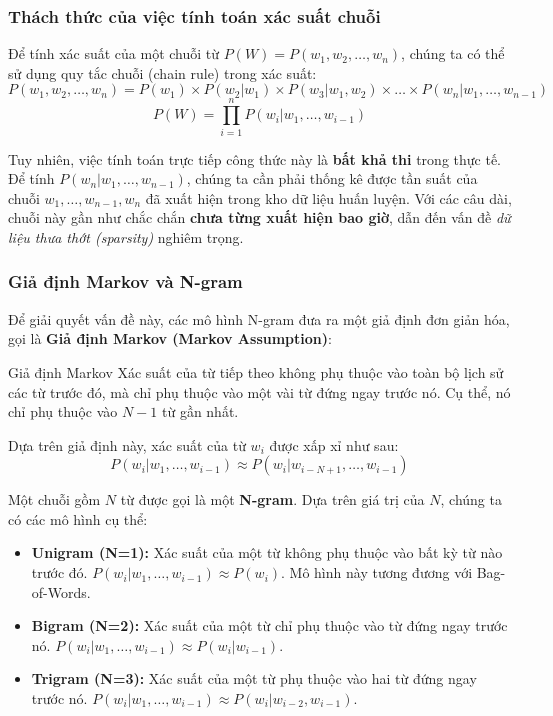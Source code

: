 \subsubsection{Thách thức của việc tính toán xác suất chuỗi}
Để tính xác suất của một chuỗi từ $P(W) = P(w_1, w_2, \dots, w_n)$, chúng ta có thể sử dụng quy tắc chuỗi (chain rule) trong xác suất:
$$ P(w_1, w_2, \dots, w_n) = P(w_1) \times P(w_2|w_1) \times P(w_3|w_1, w_2) \times \dots \times P(w_n|w_1, \dots, w_{n-1}) $$
$$ P(W) = \prod_{i=1}^{n} P(w_i | w_1, \dots, w_{i-1}) $$

Tuy nhiên, việc tính toán trực tiếp công thức này là \textbf{bất khả thi} trong thực tế. Để tính $P(w_n|w_1, \dots, w_{n-1})$, chúng ta cần phải thống kê được tần suất của chuỗi $w_1, \dots, w_{n-1}, w_n$ đã xuất hiện trong kho dữ liệu huấn luyện. Với các câu dài, chuỗi này gần như chắc chắn \textbf{chưa từng xuất hiện bao giờ}, dẫn đến vấn đề \textit{dữ liệu thưa thớt (sparsity)} nghiêm trọng.

\subsubsection{Giả định Markov và N-gram}
Để giải quyết vấn đề này, các mô hình N-gram đưa ra một giả định đơn giản hóa, gọi là \textbf{Giả định Markov (Markov Assumption)}:

\begin{assess}{Giả định Markov}
Xác suất của từ tiếp theo không phụ thuộc vào toàn bộ lịch sử các từ trước đó, mà chỉ phụ thuộc vào một vài từ đứng ngay trước nó. Cụ thể, nó chỉ phụ thuộc vào $N-1$ từ gần nhất.
\end{assess}

Dựa trên giả định này, xác suất của từ $w_i$ được xấp xỉ như sau:
$$ P(w_i | w_1, \dots, w_{i-1}) \approx P(w_i | w_{i-N+1}, \dots, w_{i-1}) $$

Một chuỗi gồm $N$ từ được gọi là một \textbf{N-gram}. Dựa trên giá trị của $N$, chúng ta có các mô hình cụ thể:
\begin{itemize}
    \item \textbf{Unigram (N=1):} Xác suất của một từ không phụ thuộc vào bất kỳ từ nào trước đó. $P(w_i|w_1, \dots, w_{i-1}) \approx P(w_i)$. Mô hình này tương đương với Bag-of-Words.
    \item \textbf{Bigram (N=2):} Xác suất của một từ chỉ phụ thuộc vào từ đứng ngay trước nó. $P(w_i|w_1, \dots, w_{i-1}) \approx P(w_i|w_{i-1})$.
    \item \textbf{Trigram (N=3):} Xác suất của một từ phụ thuộc vào hai từ đứng ngay trước nó. $P(w_i|w_1, \dots, w_{i-1}) \approx P(w_i|w_{i-2}, w_{i-1})$.
\end{itemize}

